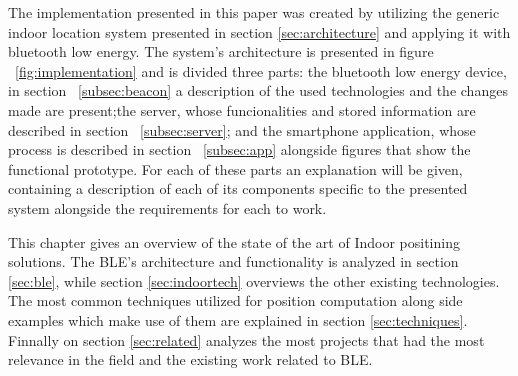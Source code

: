 
\label{cap:implement}


The implementation presented in this paper was created by utilizing the generic indoor location system presented in section \ref{sec:architecture} and applying it with bluetooth low energy. The system's architecture is presented in figure ~\ref{fig:implementation} and is divided three parts: the bluetooth low energy device, in section ~\ref{subsec:beacon} a description of the used technologies and the changes made are present;the server, whose funcionalities and stored information are described in section ~\ref{subsec:server}; and the smartphone application, whose process is described in section ~\ref{subsec:app} alongside figures that show the functional prototype. For each of these parts an explanation will be given, containing a description of each of its components specific to the presented system alongside the requirements for each to work.


This chapter gives an overview of the state of the art of Indoor positining solutions. The \acf{BLE}'s architecture and functionality is analyzed in section \ref{sec:ble}, while section \ref{sec:indoortech} overviews the other existing technologies. The most common techniques utilized for position computation along side examples which make use of them are explained in section \ref{sec:techniques}. Finnally on section \ref{sec:related} analyzes the most projects that had the most relevance in the field and the existing work related to \ac{BLE}.





\cleardoublepage
